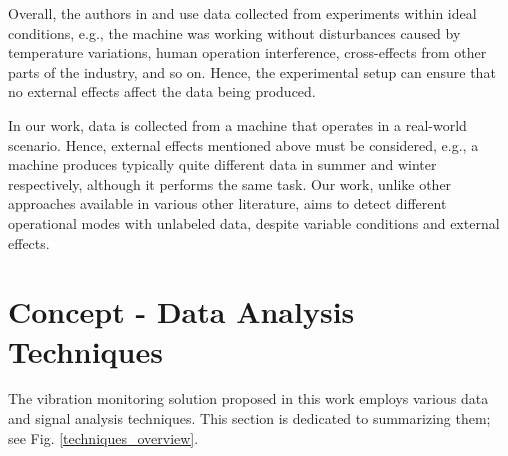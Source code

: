 \documentclass[conference]{IEEEtran}
\begin{document}
Overall, the authors in \cite{wu2017remaining} and \cite{li2020lifelong} use data collected from experiments within ideal conditions, e.g., the machine was working without disturbances caused by temperature variations, human operation interference, cross-effects from other parts of the industry, and so on. Hence, the experimental setup can ensure that no external effects affect the data being produced. 

In our work, data is collected from a machine that operates in a real-world scenario. Hence, external effects mentioned above must be considered, e.g., a machine produces typically quite different data in summer and winter respectively, although it performs the same task. Our work, unlike other approaches available in various other literature, aims to detect different operational modes with unlabeled data, despite variable conditions and external effects.

\section{Concept - Data Analysis Techniques}
\label{sec_concept}

The vibration monitoring solution proposed in this work employs various data and signal analysis techniques. This section is dedicated to summarizing them; see Fig. \ref{techniques_overview}. 

\end{document}
